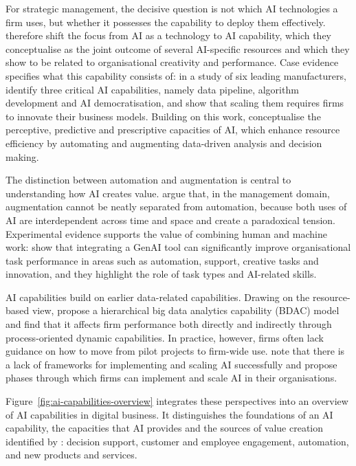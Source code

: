 For strategic management, the decisive question is not which AI technologies a firm uses, but whether it possesses the capability to deploy them effectively. \textcite[1]{mikalef2021capability} therefore shift the focus from AI as a technology to AI capability, which they conceptualise as the joint outcome of several AI-specific resources and which they show to be related to organisational creativity and performance. Case evidence specifies what this capability consists of: in a study of six leading manufacturers, \textcite[574]{sjodin2021} identify three critical AI capabilities, namely data pipeline, algorithm development and AI democratisation, and show that scaling them requires firms to innovate their business models. Building on this work, \textcite[1]{sjodin2023} conceptualise the perceptive, predictive and prescriptive capacities of AI, which enhance resource efficiency by automating and augmenting data-driven analysis and decision making.

The distinction between automation and augmentation is central to understanding how AI creates value. \textcite[192]{raisch2021} argue that, in the management domain, augmentation cannot be neatly separated from automation, because both uses of AI are interdependent across time and space and create a paradoxical tension. Experimental evidence supports the value of combining human and machine work: \textcite[1]{przegalinska2025} show that integrating a GenAI tool can significantly improve organisational task performance in areas such as automation, support, creative tasks and innovation, and they highlight the role of task types and AI-related skills.

AI capabilities build on earlier data-related capabilities. Drawing on the resource-based view, \textcite[356]{fossowamba2017} propose a hierarchical big data analytics capability (BDAC) model and find that it affects firm performance both directly and indirectly through process-oriented dynamic capabilities. In practice, however, firms often lack guidance on how to move from pilot projects to firm-wide use. \textcite[1]{haefner2023} note that there is a lack of frameworks for implementing and scaling AI successfully and propose phases through which firms can implement and scale AI in their organisations.

Figure~\ref{fig:ai-capabilities-overview} integrates these perspectives into an overview of AI capabilities in digital business. It distinguishes the foundations of an AI capability, the capacities that AI provides and the sources of value creation identified by \textcite[1]{borges2021}: decision support, customer and employee engagement, automation, and new products and services.

